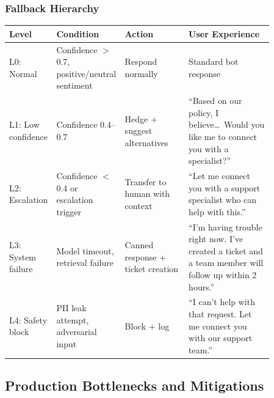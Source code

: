 \subsubsection*{Fallback Hierarchy}

\small
\begin{tabular}{|p{0.10\linewidth}|p{0.20\linewidth}|p{0.24\linewidth}|p{0.32\linewidth}|}
\hline
\textbf{Level} & \textbf{Condition} & \textbf{Action} & \textbf{User Experience} \\
\hline
L0: Normal & Confidence $>$ 0.7, positive/neutral sentiment & Respond normally & Standard bot response \\
\hline
L1: Low confidence & Confidence 0.4--0.7 & Hedge + suggest alternatives & ``Based on our policy, I believe\ldots\ Would you like me to connect you with a specialist?'' \\
\hline
L2: Escalation & Confidence $<$ 0.4 or escalation trigger & Transfer to human with context & ``Let me connect you with a support specialist who can help with this.'' \\
\hline
L3: System failure & Model timeout, retrieval failure & Canned response + ticket creation & ``I'm having trouble right now. I've created a ticket and a team member will follow up within 2 hours.'' \\
\hline
L4: Safety block & PII leak attempt, adversarial input & Block + log & ``I can't help with that request. Let me connect you with our support team.'' \\
\hline
\end{tabular}
\normalsize

\subsection*{Production Bottlenecks and Mitigations}

